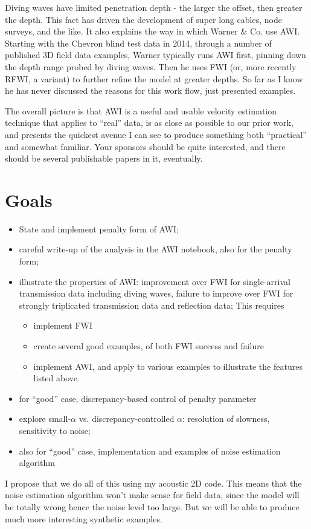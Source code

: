 Diving waves have limited penetration depth - the larger the offset, then greater the depth. This fact has driven the development of super long cables, node surveys, and the like. It also explains the way in which Warner \& Co. use AWI. Starting with the Chevron blind test data in 2014, through a number of published 3D field data examples, Warner typically runs AWI first, pinning down the depth range probed by diving waves. Then he uses FWI (or, more recently RFWI, a variant) to further refine the model at greater depths. So far as I know he has never discussed the reasons for this work flow, just presented examples.

The overall picture is that AWI is a useful and usable velocity estimation technique that applies to ``real'' data, is as close as possible to our prior work, and presents the quickest avenue I can see to produce something both ``practical'' and somewhat familiar. Your sponsors should be quite interested, and there should be several publishable papers in it, eventually. 

\section{Goals}
\begin{itemize}
\item State and implement penalty form of AWI;
\item careful write-up of the analysis in the AWI notebook, also for the penalty form;
\item illustrate the properties of AWI: improvement over FWI for single-arrival transmission data including diving waves, failure to improve over FWI for strongly triplicated transmission data and reflection data; This requires
  \begin{itemize}
  \item implement FWI
  \item create several good examples, of both FWI success and failure
  \item implement AWI, and apply to various examples to illustrate the features listed above.
  \end{itemize}
\item for ``good'' case, discrepancy-based control of penalty parameter
\item explore small-$\alpha$ vs. discrepancy-controlled $\alpha$: resolution of slowness, sensitivity to noise;
\item also for ``good'' case, implementation and examples of noise estimation algorithm
\end{itemize}
I propose that we do all of this using my acoustic 2D code. This means that the noise estimation algorithm won't make sense for field data, since the model will be totally wrong hence the noise level too large. But we will be able to produce much more interesting synthetic examples.

